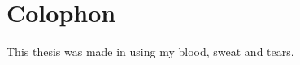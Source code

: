 \documentclass[\relativeRoot/main.tex]{subfiles}
\begin{document}
    
\chapter*{Colophon}
This thesis was made in \LaTeXe{} using my blood, sweat and tears.

\listoffigures
\listoftables
\printglossary[title={Abbreviations},type=acronym,style=long]
\end{document}
